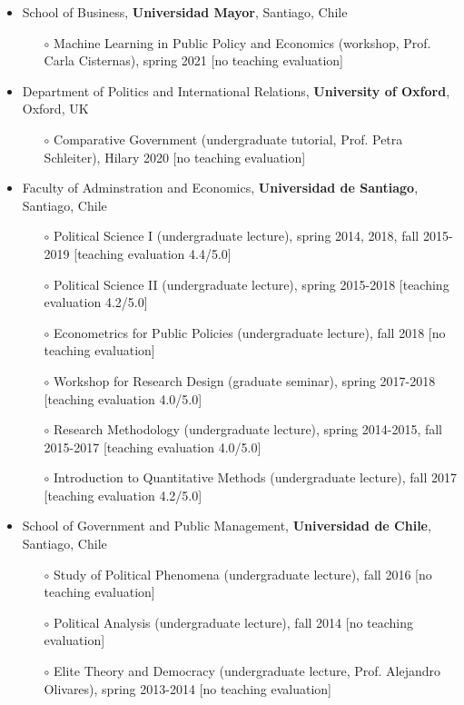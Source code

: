 \begin{publications}

\begin{itemize}
\item{\small School of Business, {\bfseries Universidad Mayor}, Santiago, Chile}
\begin{itemize}
\item[$\circ$]{\small Machine Learning in Public Policy and Economics (workshop, Prof. Carla Cisternas), spring 2021 [no teaching evaluation]}
\end{itemize}
\item{\small Department of Politics and International Relations, {\bfseries University of Oxford}, Oxford, UK}
\begin{itemize}
\item[$\circ$]{\small Comparative Government (undergraduate tutorial, Prof. Petra Schleiter), Hilary 2020 [no teaching evaluation]}
\end{itemize}
\item{\small Faculty of Adminstration and Economics, {\bfseries Universidad de Santiago}, Santiago, Chile}
\begin{itemize}
\item[$\circ$]{\small Political Science I (undergraduate lecture), spring 2014, 2018, fall 2015-2019 [teaching evaluation 4.4/5.0]}
\item[$\circ$]{\small Political Science II (undergraduate lecture), spring 2015-2018 [teaching evaluation 4.2/5.0]}
\item[$\circ$]{\small Econometrics for Public Policies (undergraduate lecture), fall 2018 [no teaching evaluation]}
\item[$\circ$]{\small Workshop for Research Design (graduate seminar), spring 2017-2018 [teaching evaluation 4.0/5.0]}
\item[$\circ$]{\small Research Methodology (undergraduate lecture), spring 2014-2015, fall 2015-2017 [teaching evaluation 4.0/5.0]}
\item[$\circ$]{\small Introduction to Quantitative Methods (undergraduate lecture), fall 2017 [teaching evaluation 4.2/5.0]}
\end{itemize}
\item{\small School of Government and Public Management, {\bfseries Universidad de Chile}, Santiago, Chile}
\begin{itemize}
\item[$\circ$]{\small Study of Political Phenomena (undergraduate lecture), fall 2016 [no teaching evaluation]}
\item[$\circ$]{\small Political Analysis (undergraduate lecture), fall 2014 [no teaching evaluation]}
\item[$\circ$]{\small Elite Theory and Democracy (undergraduate lecture, Prof. Alejandro Olivares), spring 2013-2014 [no teaching evaluation]}
\end{itemize}
\end{itemize}


\end{publications}

